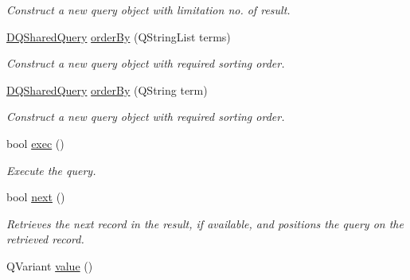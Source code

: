 \begin{DoxyCompactItemize}
\begin{DoxyCompactList}\small\item\em Construct a new query object with limitation no. of result. \item\end{DoxyCompactList}\item 
\hyperlink{classDQSharedQuery}{DQSharedQuery} \hyperlink{classDQSharedQuery_a5bb811ceac95142fb45e2b1b0230fe76}{orderBy} (QStringList terms)
\begin{DoxyCompactList}\small\item\em Construct a new query object with required sorting order. \item\end{DoxyCompactList}\item 
\hyperlink{classDQSharedQuery}{DQSharedQuery} \hyperlink{classDQSharedQuery_aed99232bd84c8871265ab567b5550fe2}{orderBy} (QString term)
\begin{DoxyCompactList}\small\item\em Construct a new query object with required sorting order. \item\end{DoxyCompactList}\item 
\hypertarget{classDQSharedQuery_af9cb13ee212cf95235f982360755c263}{
bool \hyperlink{classDQSharedQuery_af9cb13ee212cf95235f982360755c263}{exec} ()}
\label{classDQSharedQuery_af9cb13ee212cf95235f982360755c263}

\begin{DoxyCompactList}\small\item\em Execute the query. \item\end{DoxyCompactList}\item 
\hypertarget{classDQSharedQuery_a454580a6ba5a8d27690b7cada60cf696}{
bool \hyperlink{classDQSharedQuery_a454580a6ba5a8d27690b7cada60cf696}{next} ()}
\label{classDQSharedQuery_a454580a6ba5a8d27690b7cada60cf696}

\begin{DoxyCompactList}\small\item\em Retrieves the next record in the result, if available, and positions the query on the retrieved record. \item\end{DoxyCompactList}\item 
\hypertarget{classDQSharedQuery_a2e4b80d4ddab5c7476fd5795a7321f0a}{
QVariant \hyperlink{classDQSharedQuery_a2e4b80d4ddab5c7476fd5795a7321f0a}{value} ()}
\label{classDQSharedQuery_a2e4b80d4ddab5c7476fd5795a7321f0a}


\end{DoxyCompactItemize}
